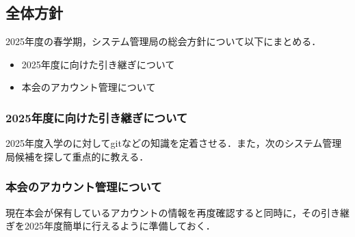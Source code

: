 \subsection*{全体方針}


2025年度の春学期，システム管理局の総会方針について以下にまとめる．
\begin{itemize}
    \item 2025年度に向けた引き継ぎについて
    \item 本会のアカウント管理について
\end{itemize}

\subsubsection*{2025年度に向けた引き継ぎについて}
2025年度入学の\firstGrade{}に対してgitなどの知識を定着させる．また，次のシステム管理局候補を探して重点的に教える．

\subsubsection*{本会のアカウント管理について}
現在本会が保有しているアカウントの情報を再度確認すると同時に，その引き継ぎを2025年度簡単に行えるように準備しておく．
